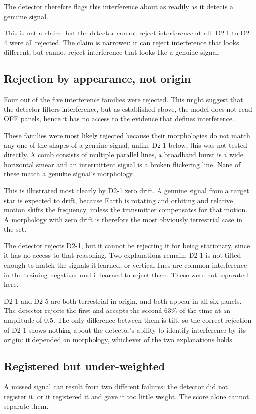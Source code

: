 \documentclass[11pt]{article}
\begin{document}
The detector therefore flags this interference about as readily as it detects a genuine signal.

This is not a claim that the detector cannot reject interference at all. D2-1 to D2-4 were all rejected. The claim is narrower: it can reject interference that looks different, but cannot reject interference that looks like a genuine signal.

\subsection{Rejection by appearance, not origin}
Four out of the five interference families were rejected. This might suggest that the detector filters interference, but as established above, the model does not read OFF panels, hence it has no access to the evidence that defines interference.

These families were most likely rejected because their morphologies do not match any one of the shapes of a genuine signal; unlike D2-1 below, this was not tested directly. A comb consists of multiple parallel lines, a broadband burst is a wide horizontal smear and an intermittent signal is a broken flickering line. None of these match a genuine signal's morphology.

This is illustrated most clearly by D2-1 zero drift. A genuine signal from a target star is expected to drift, because Earth is rotating and orbiting and relative motion shifts the frequency, unless the transmitter compensates for that motion. A morphology with zero drift is therefore the most obviously terrestrial case in the set.

The detector rejects D2-1, but it cannot be rejecting it for being stationary, since it has no access to that reasoning. Two explanations remain: D2-1 is not tilted enough to match the signals it learned, or vertical lines are common interference in the training negatives and it learned to reject them. These were not separated here.

D2-1 and D2-5 are both terrestrial in origin, and both appear in all six panels. The detector rejects the first and accepts the second 63\% of the time at an amplitude of 0.5. The only difference between them is tilt, so the correct rejection of D2-1 shows nothing about the detector's ability to identify interference by its origin: it depended on morphology, whichever of the two explanations holds.

\subsection{Registered but under-weighted}
A missed signal can result from two different failures: the detector did not register it, or it registered it and gave it too little weight. The score alone cannot separate them.
\end{document}
